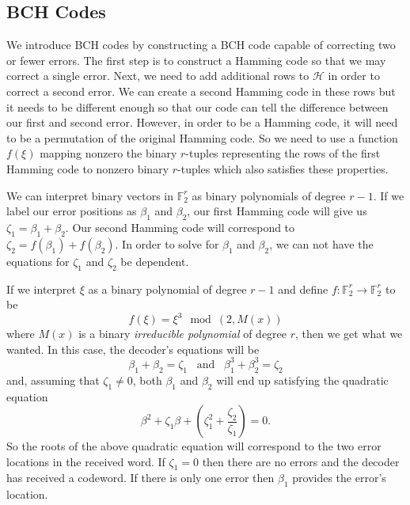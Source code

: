 \subsection{BCH Codes}

We introduce BCH codes by constructing a BCH code capable of correcting two or fewer errors. The first step is to construct a Hamming code so that we may correct a single error. Next, we need to add additional rows to $\mathscr{H}$ in order to correct a second error. We can create a second Hamming code in these rows but it needs to be different enough so that our code can tell the difference between our first and second error. However, in order to be a Hamming code, it will need to be a permutation of the original Hamming code. So we need to use a function $f(\xi)$ mapping nonzero the binary $r$-tuples representing the rows of the first Hamming code to nonzero binary $r$-tuples which also satisfies these properties.

We can interpret binary vectors in $\mathbb{F}_2^r$ as binary polynomials of degree $r - 1$. If we label our error positions as $\beta_1$ and $\beta_2$, our first Hamming code will give us $\zeta_1 = \beta_1 + \beta_2$. Our second Hamming code will correspond to $\zeta_2 = f(\beta_1) + f(\beta_2)$. In order to solve for $\beta_1$ and $\beta_2$, we can not have the equations for $\zeta_1$ and $\zeta_2$ be dependent.

If we interpret $\xi$ as a binary polynomial of degree $r - 1$ and define $f:\mathbb{F}_2^r \to \mathbb{F}_2^r$ to be
\[
    f(\xi) = \xi^3 \mod (2, M(x))
\]
where $M(x)$ is a binary \textit{irreducible polynomial} of degree $r$, then we get what we wanted. In this case, the decoder's equations will be
\[
    \beta_1 + \beta_2 = \zeta_1 \hspace{10pt} \text{and} \hspace{10pt} \beta_1^3 + \beta_2^3 = \zeta_2
\]
and, assuming that $\zeta_1 \neq 0$, both $\beta_1$ and $\beta_2$ will end up satisfying the quadratic equation
\[
    \beta^2 + \zeta_1\beta + \left(\zeta_1^2 + \frac{\zeta_2}{\zeta_1}\right) = 0.
\]
So the roots of the above quadratic equation will correspond to the two error locations in the received word. If $\zeta_1 = 0$ then there are no errors and the decoder has received a codeword. If there is only one error then $\beta_1$ provides the error's location.

